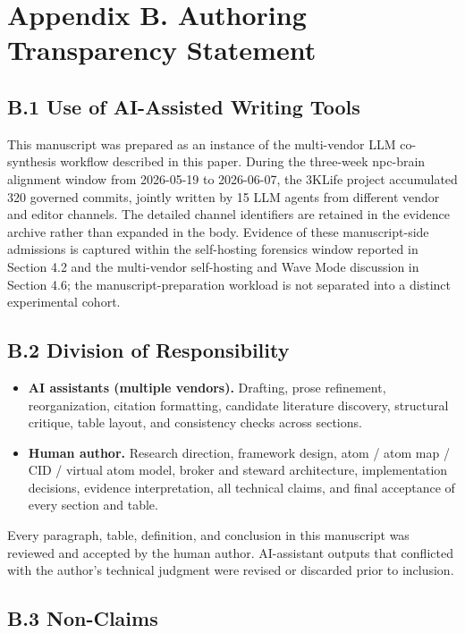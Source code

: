 \documentclass[9pt,letterpaper]{extarticle}
\begin{document}
\section*{Appendix B. Authoring Transparency Statement}

\subsection*{B.1 Use of AI-Assisted Writing Tools}

This manuscript was prepared as an instance of the multi-vendor LLM co-synthesis workflow described in this paper. During the three-week npc-brain alignment window from 2026-05-19 to 2026-06-07, the 3KLife project accumulated 320 governed commits, jointly written by 15 LLM agents from different vendor and editor channels. The detailed channel identifiers are retained in the evidence archive rather than expanded in the body. Evidence of these manuscript-side admissions is captured within the self-hosting forensics window reported in Section 4.2 and the multi-vendor self-hosting and Wave Mode discussion in Section 4.6; the manuscript-preparation workload is not separated into a distinct experimental cohort.

\subsection*{B.2 Division of Responsibility}

\begin{itemize}
\item \textbf{AI assistants (multiple vendors).} Drafting, prose refinement, reorganization, citation formatting, candidate literature discovery, structural critique, table layout, and consistency checks across sections.
\item \textbf{Human author.} Research direction, framework design, atom / atom map / CID / virtual atom model, broker and steward architecture, implementation decisions, evidence interpretation, all technical claims, and final acceptance of every section and table.
\end{itemize}

Every paragraph, table, definition, and conclusion in this manuscript was reviewed and accepted by the human author. AI-assistant outputs that conflicted with the author's technical judgment were revised or discarded prior to inclusion.

\subsection*{B.3 Non-Claims}
\end{document}
